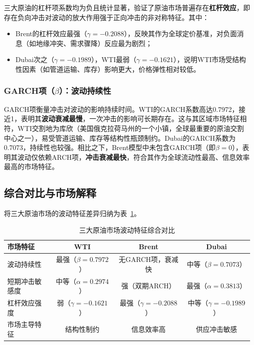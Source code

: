 \documentclass[12pt,a4paper]{ctexart}
\begin{document}
三大原油的杠杆项系数均为负且统计显著，验证了原油市场普遍存在\textbf{杠杆效应}，即存在负向冲击对波动的放大作用强于正向冲击的非对称特征。其中：
\begin{itemize}
\item Brent的杠杆效应最强（\(\gamma = -0.2088\)），反映其作为全球定价基准，对负面消息（如地缘冲突、需求骤降）反应最为剧烈；
\item Dubai次之（\(\gamma = -0.1989\)），WTI最弱（\(\gamma = -0.1621\)），说明WTI市场受结构性因素（如管道运输、库存）影响更大，价格弹性相对较低。
\end{itemize}

\subsubsection{GARCH项（\(\beta\)）：波动持续性}

GARCH项衡量冲击对波动的影响持续时间。WTI的GARCH系数高达0.7972，接近1，表明其\textbf{波动衰减最慢}，一次冲击的影响可长期存在。这与其区域市场特征相符，WTI交割地为库欣（美国俄克拉荷马州的一个小镇，全球最重要的原油交割中心之一），易受管道运输、库存等结构性瓶颈制约。Dubai的GARCH系数为0.7073，持续性也较强。相比之下，Brent模型中未包含GARCH项（即\(\beta=0\)），表明其波动仅依赖ARCH项，\textbf{冲击衰减最快}，符合其作为全球流动性最高、信息效率最高的市场特征。

\subsection{综合对比与市场解释}

将三大原油市场的波动特征差异归纳为表~\ref{tab:comparison}。

\begin{table}[H]
\centering
\caption{三大原油市场波动特征综合对比}
\label{tab:comparison}
\begin{tabular}{lccc}
\toprule
市场特征 & WTI & Brent & Dubai \\
\midrule
波动持续性 & 最强（\(\beta=0.7972\)） & 无GARCH项，衰减快 & 中等（\(\beta=0.7073\)） \\
短期冲击敏感度 & 中等（\(\alpha=0.2974\)） & 强（双期ARCH） & 最强（\(\alpha=0.3813\)） \\
杠杆效应强度 & 弱（\(\gamma=-0.1621\)） & 最强（\(\gamma=-0.2088\)） & 中等（\(\gamma=-0.1989\)） \\
市场主导特征 & 结构性制约 & 信息效率高 & 供应冲击敏感 \\
\bottomrule
\end{tabular}
\end{table}
\end{document}
